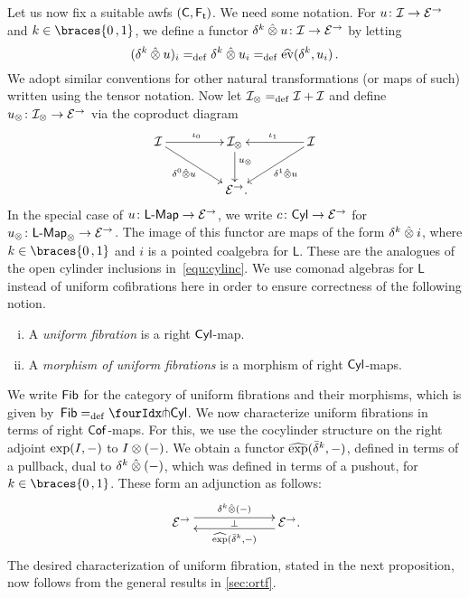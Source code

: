 \documentclass[reqno,10pt,a4paper,oneside,draft]{amsart}
\newcommand{\LL}{\mathsf{L}}
\begin{document}
{{Let us now fix a suitable awfs $(\mathsf{C}, \mathsf{F_t})$.
We need some notation.
For $u \colon \mathcal{I} \to \mathcal{E}^\to$ and $k \in \braces{0\,, 1}$, we define a functor $\delta^k \mathbin{\hat{\otimes}} u \colon \mathcal{I} \to \mathcal{E}^\to$ by letting
\[
(\delta^k \mathbin{\hat{\otimes}} u)_i =_{\operatorname{def}} \delta^k \mathbin{\hat{\otimes}} u_i  =_{\operatorname{def}} \widehat{\operatorname{ev}}(\delta^k, u_i)
\, .\]
We adopt similar conventions for other natural transformations (or maps of such) written using the tensor notation.
Now let $\mathcal{I}_\otimes =_{\operatorname{def}} \mathcal{I} + \mathcal{I}$ and define $u_\otimes \colon \mathcal{I}_\otimes \to \mathcal{E}^\to$ via the coproduct diagram
\begin{equation} \label{equ:u-tensor}
\begin{gathered}
\xymatrix@C+2em{
  \cal{I}
  \ar[r]^{\iota_0}
  \ar[dr]_-{\lcyl \hatotimes u}
&
  \cal{I}_\otimes
  \ar[d]^(.4){u_\otimes}
&
  \cal{I}
  \ar[dl]^-{\rcyl \hatotimes u}
  \ar[l]_{\iota_1}
\\&
  \catE^\to
\rlap{.}}
\end{gathered}
\end{equation}
In the special case of $u \co \pCoalg{\LL} \to \cal{E}^\to$, we write $c \colon \mathsf{Cyl} \to \mathcal{E}^\to$ for $u_\otimes \co \pCoalg{\LL}_\otimes \to \cal{E}^\to$.
The image of this functor are maps of the form $\delta^k \mathbin{\hat{\otimes}} i$, where $k \in \braces{0\,, 1}$ and $i$ is a pointed coalgebra for $\LL$.
These are the analogues of the open cylinder inclusions in~\eqref{equ:cylinc}.
We use comonad algebras for $\LL$ instead of uniform cofibrations here in order to ensure correctness of the following notion.

\begin{definition} \label{def:I-fibration} \leavevmode
\begin{enumerate}[(i)]
\item A \emph{uniform fibration} is a right $\mathsf{Cyl}$-map.
\item A \emph{morphism of uniform fibrations} is a morphism of right $\mathsf{Cyl}$-maps.
\end{enumerate}
\end{definition}

We write $\mathsf{Fib}$ for the category of uniform fibrations and their morphisms, which is given by~$\Fib  \defeq \liftr{\Cyl}$.
We now characterize uniform fibrations in terms of right $\mathsf{Cof}$-maps.
For this, we use the cocylinder structure on the right adjoint $\exp(I, -)$ to $I \otimes (-)$.
We obtain a functor $\operatorname{\widehat{exp}}(\bar{\delta}^k, -)$, defined in terms of a pullback, dual to $\delta^k \mathbin{\hat{\otimes}} (-)$, which was defined in terms of a pushout, for~$k \in \braces{0\,, 1}$.
These form an adjunction as follows:
\[
\xymatrix@C+4em{
  \catE^\to
  \ar@<1ex>[r]^{\kcyl \hatotimes (-)}
  \ar@{}[r]|{\bot}
&
  \catE^\to
  \ar@<1ex>[l]^{\hatexp(\bar{\delta}^k, -)}
\rlap{.}}
\]
The desired characterization of uniform fibration, stated in the next proposition, now follows from the general results in \cref{sec:ortf}.

}}
\end{document}

